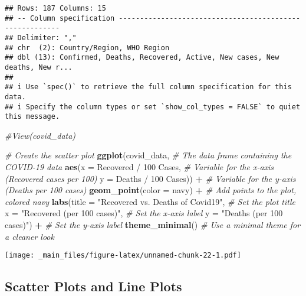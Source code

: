 \documentclass[
]{book}
\newenvironment{Shaded}{\begin{snugshade}}{\end{snugshade}}
\newcommand{\AttributeTok}[1]{\textcolor[rgb]{0.13,0.29,0.53}{#1}}
\newcommand{\CommentTok}[1]{\textcolor[rgb]{0.56,0.35,0.01}{\textit{#1}}}
\newcommand{\FunctionTok}[1]{\textcolor[rgb]{0.13,0.29,0.53}{\textbf{#1}}}
\newcommand{\NormalTok}[1]{#1}
\newcommand{\SpecialCharTok}[1]{\textcolor[rgb]{0.81,0.36,0.00}{\textbf{#1}}}
\newcommand{\StringTok}[1]{\textcolor[rgb]{0.31,0.60,0.02}{#1}}
\begin{document}
\begin{verbatim}
## Rows: 187 Columns: 15
## -- Column specification --------------------------------------------------------
## Delimiter: ","
## chr  (2): Country/Region, WHO Region
## dbl (13): Confirmed, Deaths, Recovered, Active, New cases, New deaths, New r...
## 
## i Use `spec()` to retrieve the full column specification for this data.
## i Specify the column types or set `show_col_types = FALSE` to quiet this message.
\end{verbatim}

\begin{Shaded}
\begin{Highlighting}[]
\CommentTok{\#View(covid\_data)}

\CommentTok{\# Create the scatter plot}
\FunctionTok{ggplot}\NormalTok{(covid\_data, }\CommentTok{\# The data frame containing the COVID{-}19 data}
       \FunctionTok{aes}\NormalTok{(}\AttributeTok{x =} \StringTok{\textasciigrave{}}\AttributeTok{Recovered / 100 Cases}\StringTok{\textasciigrave{}}\NormalTok{, }\CommentTok{\# Variable for the x{-}axis (Recovered cases per 100)}
           \AttributeTok{y =} \StringTok{\textasciigrave{}}\AttributeTok{Deaths / 100 Cases}\StringTok{\textasciigrave{}}\NormalTok{)) }\SpecialCharTok{+} \CommentTok{\# Variable for the y{-}axis (Deaths per 100 cases)}
  \FunctionTok{geom\_point}\NormalTok{(}\AttributeTok{color =} \StringTok{\textquotesingle{}navy\textquotesingle{}}\NormalTok{) }\SpecialCharTok{+} \CommentTok{\# Add points to the plot, colored navy}
  \FunctionTok{labs}\NormalTok{(}\AttributeTok{title =} \StringTok{"Recovered vs. Deaths of Covid19"}\NormalTok{, }\CommentTok{\# Set the plot title}
       \AttributeTok{x =} \StringTok{"Recovered (per 100 cases)"}\NormalTok{, }\CommentTok{\# Set the x{-}axis label}
       \AttributeTok{y =} \StringTok{"Deaths (per 100 cases)"}\NormalTok{) }\SpecialCharTok{+} \CommentTok{\# Set the y{-}axis label}
  \FunctionTok{theme\_minimal}\NormalTok{() }\CommentTok{\# Use a minimal theme for a cleaner look}
\end{Highlighting}
\end{Shaded}

\texttt{[image: \_main\_files/figure-latex/unnamed-chunk-22-1.pdf]}

\subsection{Scatter Plots and Line Plots}\label{scatter-plots-and-line-plots}
\end{document}

